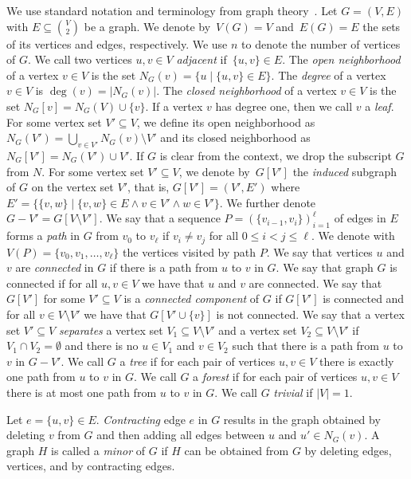 \documentclass[a4paper,UKenglish,cleveref, autoref, thm-restate, numberwithinsect]{lipics-v2021}
\begin{document}
We use standard notation and terminology from graph theory~\cite{Die16}. 
Let $G=(V,E)$ with $E\subseteq \binom{V}{2}$ be a graph. We denote by~$V(G)=V$ and~$E(G)=E$ the sets of its vertices and edges, respectively.
We use $n$ to denote the number of vertices of $G$.
We call two vertices $u,v\in V$ \emph{adjacent} if~$\{u,v\}\in E$.
The \emph{open neighborhood} of a vertex $v\in V$ is the set $N_G(v)=\{u \mid \{u,v\}\in E\}$. 
The \emph{degree} of a vertex $v\in V$ is $\deg(v)=|N_G(v)|$.
The \emph{closed neighborhood} of a vertex $v\in V$ is the set $N_G[v]=N_G(V)\cup\{v\}$. 
If a vertex $v$ has degree one, then we call $v$ a \emph{leaf}.
For some vertex set $V'\subseteq V$, we define its open neighborhood as $N_G(V')=\bigcup_{v\in V'}N_G(v)\setminus V'$ and its closed neighborhood as $N_G[V']=N_G(V')\cup V'$.
If $G$ is clear from the context, we drop the subscript $G$ from $N$.
For some vertex set $V'\subseteq V$, we denote by~$G[V']$ the \emph{induced} subgraph of $G$ on the vertex set $V'$, that is, $G[V']=(V',E')$ where $E' = \{\{v,w\}\mid \{v,w\}\in E\wedge v\in V'\wedge w\in V'\}$. We further denote $G-V'=G[V\setminus V']$.
We say that a sequence $P=(\{v_{i-1},v_i\})_{i=1}^\ell$ of edges in $E$ forms a \emph{path} in $G$ from $v_0$ to $v_\ell$ if $v_{i}\neq v_j$ for all $0\le i<j\le \ell$.
We denote with $V(P)=\{v_0,v_1,\ldots,v_\ell\}$ the vertices visited by path $P$.
We say that vertices $u$ and $v$ are \emph{connected} in $G$ if there is a path from $u$ to $v$ in $G$. We say that graph $G$ is connected if for all $u,v\in V$ we have that $u$ and $v$ are connected. We say that $G[V']$ for some $V'\subseteq V$ is a \emph{connected component} of $G$ if $G[V']$ is connected and for all $v\in V\setminus V'$ we have that $G[V'\cup\{v\}]$ is not connected.
We say that a vertex set $V'\subseteq  V$ \emph{separates} a vertex set $V_1\subseteq V\setminus V'$ and a vertex set $V_2\subseteq V\setminus V'$ if $V_1\cap V_2=\emptyset$ and there is no $u\in V_1$ and $v\in V_2$ such that there is a path from $u$ to $v$ in $G-V'$.
We call $G$ a \emph{tree} if for each pair of vertices $u,v\in V$ there is exactly one path from $u$ to $v$ in $G$. We call $G$ a \emph{forest} if for each pair of vertices $u,v\in V$ there is at most one path from $u$ to $v$ in $G$. We call $G$ \emph{trivial} if $|V|=1$.

Let $e=\{u,v\}\in E$. \emph{Contracting} edge $e$ in $G$ results in the graph obtained by deleting $v$ from $G$ and then adding all edges between $u$ and $u'\in N_G(v)$.
A graph $H$ is called a \emph{minor} of $G$ if $H$ can be obtained from $G$ by deleting edges, vertices, and by contracting edges. 
\end{document}
